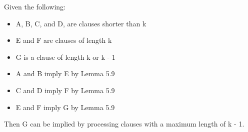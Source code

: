 \documentclass[manuscript]{acmart}
\begin{document}
    \begin{lemma}
        Given the following:
        \begin{itemize}
            \item A, B, C, and D, are clauses shorter than k
            \item E and F are clauses of length k
            \item G is a clause of length k or k - 1
            \item A and B imply E by Lemma 5.9
            \item C and D imply F by Lemma 5.9
            \item E and F imply G by Lemma 5.9
        \end{itemize}
        Then G can be implied by processing clauses with a maximum length of k - 1.
    \end{lemma}
\end{document}
